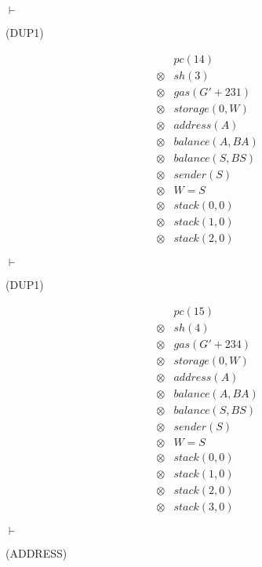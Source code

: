 $\vdash$ \begin{flushright}(DUP1)\end{flushright}

\[
  \begin{array}{rcl}
    &&pc(14)\\
    &\otimes& sh(3)\\
    &\otimes& gas(G' + 231)\\
    &\otimes& storage(0, W)\\
    &\otimes& address(A)\\
    &\otimes& balance(A, BA)\\
    &\otimes& balance(S, BS)\\
    &\otimes& sender(S)\\
    &\otimes& W = S\\
    &\otimes& stack(0, 0)\\
    &\otimes& stack(1, 0)\\
    &\otimes& stack(2, 0)
  \end{array}
\]


$\vdash$ \begin{flushright}(DUP1)\end{flushright}

\[
  \begin{array}{rcl}
    &&pc(15)\\
    &\otimes& sh(4)\\
    &\otimes& gas(G' + 234)\\
    &\otimes& storage(0, W)\\
    &\otimes& address(A)\\
    &\otimes& balance(A, BA)\\
    &\otimes& balance(S, BS)\\
    &\otimes& sender(S)\\
    &\otimes& W = S\\
    &\otimes& stack(0, 0)\\
    &\otimes& stack(1, 0)\\
    &\otimes& stack(2, 0)\\
    &\otimes& stack(3, 0)
  \end{array}
\]

$\vdash$ \begin{flushright}(ADDRESS)\end{flushright}

